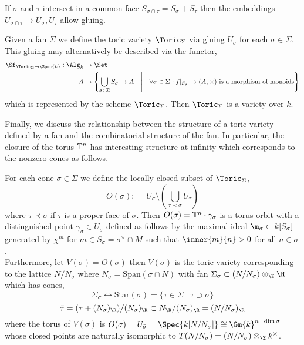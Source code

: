 \begin{remark}
If $\sigma$ and $\tau$ intersect in a common face $S_{\sigma \cap \tau} = S_\sigma + S_\tau$ then the embeddings $U_{\sigma \cap \tau} \to U_{\sigma}, U_{\tau}$ allow gluing. 
\end{remark}


\begin{definition}
Given a fan $\Sigma$ we define the toric variety $\Toric_\Sigma$ via gluing $U_\sigma$ for each $\sigma \in \Sigma$. This gluing may alternatively be described via the functor,
\begin{align*}
\Sf_{\Toric_\Sigma \to \Spec{k}} : \Alg_k & \to \Set
\\
A & \mapsto \left\{ \bigcup_{\sigma \in \Sigma} S_\sigma \to A \quad \middle| \quad \forall \sigma \in \Sigma : f|_{S_\sigma} \to (A, \times) \text{ is a morphism of monoids} \right\} 
\end{align*}
which is represented by the scheme $\Toric_\Sigma$. Then $\Toric_\Sigma$ is a variety over $k$.
\end{definition}

Finally, we discuss the relationship between the structure of a toric variety defined by a fan and the combinatorial structure of the fan. In particular, the closure of the torus $\mathbb{T}^n$ has interesting structure at infinity which corresponds to the nonzero cones as follows.

\begin{prop}
For each cone $\sigma \in \Sigma$ we define the locally closed subset of $\Toric_\Sigma$,
\[ O(\sigma) : = U_\sigma \setminus \left( \bigcup_{\tau \prec \sigma} U_\tau \right) \]
where $\tau \prec \sigma$ if $\tau$ is a proper face of $\sigma$. Then $O(\sigma) = \mathbb{T}^n \cdot \gamma_\sigma$ is a torus-orbit with a distinguished point $\gamma_\sigma \in U_\sigma$ defined as follows by the maximal ideal $\m_\sigma \subset k[S_\sigma]$ generated by $\chi^m$ for $m \in S_\sigma = \sigma^\vee \cap M$ such that $\inner{m}{n} > 0$ for all $n \in \sigma$.
\bigskip\\
Furthermore, let $V(\sigma) = \overline{O(\sigma)}$ then $V(\sigma)$ is the toric variety corresponding to the lattice $N / N_\sigma$ where $N_\sigma = \mathrm{Span}(\sigma \cap N)$ with fan $\Sigma_\sigma \subset (N/N_\sigma) \otimes_\Z \R$ which has cones,
\[ \Sigma_\sigma \leftrightarrow \mathrm{Star}(\sigma) = \{ \tau \in \Sigma \mid \tau \supset \sigma \} \]
\[ \bar{\tau} = (\tau + (N_\sigma)_\R)/ (N_\sigma)_\R \subset N_\R / (N_\sigma)_\R = (N/ N_\sigma)_\R \]
where the torus of $V(\sigma)$ is $O(\sigma) = U_{\bar{\sigma}} = \Spec{k[N/N_\sigma]} \cong \Gm{k}^{n - \dim{\sigma}}$ whose closed points are naturally isomorphic to $T(N/N_\sigma) = (N / N_\sigma) \otimes_\Z k^\times$. 
\end{prop}

